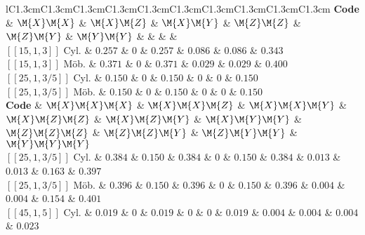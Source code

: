 \begin{table*}[t]
    \centering
    \setlength{\tabcolsep}{3pt}
    \caption{Fraction of non-correctable error patterns per error class of cylindrical codes using \acl{MWPM}.}
    \label{tab:Err}
    \small
    \begin{tabular}{lC{1.3cm}C{1.3cm}C{1.3cm}C{1.3cm}C{1.3cm}C{1.3cm}C{1.3cm}C{1.3cm}C{1.3cm}C{1.3cm}}
        \toprule
        \textbf{Code} & $\M{X}\M{X}$ & $\M{X}\M{Z}$ & $\M{X}\M{Y}$ & $\M{Z}\M{Z}$ & $\M{Z}\M{Y}$ & $\M{Y}\M{Y}$ & & & &\\
        \midrule
        $[[15,1,3]]$ Cyl. & $0.257$ & $0$ & $0.257$  & $0.086$  & $0.086$ & $0.343$ \\
        $[[15,1,3]]$ M\"{o}b. & $0.371$ & $0$ & $0.371$  & $0.029$  & $0.029$ & $0.400$ \\
        $[[25,1,3/5]]$ Cyl. & $0.150$ & $0$ & $0.150$ & $0$ & $0$ & $0.150$ \\
        $[[25,1,3/5]]$ M\"{o}b. & $0.150$ & $0$ & $0.150$ & $0$ & $0$ & $0.150$ \\
        \midrule 
        \textbf{Code} & $\M{X}\M{X}\M{X}$ & $\M{X}\M{X}\M{Z}$ & $\M{X}\M{X}\M{Y}$ & $\M{X}\M{Z}\M{Z}$ & $\M{X}\M{Z}\M{Y}$ & $\M{X}\M{Y}\M{Y}$ & $\M{Z}\M{Z}\M{Z}$ & $\M{Z}\M{Z}\M{Y}$ & $\M{Z}\M{Y}\M{Y}$ & $\M{Y}\M{Y}\M{Y}$\\
        \midrule
        $[[25,1,3/5]]$ Cyl. & $0.384$ & $0.150$ & $0.384$ & $0$ & $0.150$ & $0.384$ & $0.013$ & $0.013$ & $0.163$ & $0.397$ \\
        $[[25,1,3/5]]$ M\"{o}b. & $0.396$ & $0.150 $ & $0.396$ & $0$ & $0.150$ & $0.396 $ & $0.004$ & $0.004$ & $0.154$ & $0.401$ \\
        $[[45,1,5]]$ Cyl. & $0.019$ & $0$ & $0.019$ & $0$ & $0$ & $0.019$ & $0.004$ & $0.004$ & $0.004$ & $0.023$ \\

\end{tabular}
\end{table*}
